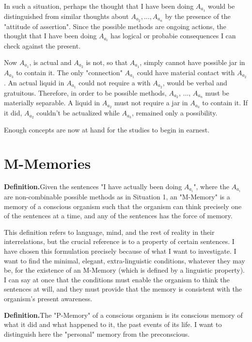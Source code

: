 In such a situation, perhaps the thought that I have been doing $A_{a_1}$
would be distinguished from similar thoughts about $A_{a_2}, ..., A_{a_n}$ by the
presence of the "attitude of assertion". Since the possible methods are 
ongoing actions, the thought that I have been doing $A_{a_i}$ has logical or 
probabie consequences I can check against the present. 

Now $A_{a_1}$, is actual and $A_{a_2}$ is not, so that $A_{a_1}$, simply cannot have 
possible jar in $A_{a_3}$ to contain it. The only "connection" $A_{a_1}$ could have
material contact with $A_{a_2}$. An actual liquid in $A_{a_1}$ could not require a 
with $A_{a_2}$, would be verbal and gratuitous. Therefore, in order to be possible 
methods, $A_{a_2}$, ..., $A_{a_n}$ must be materially separable. A liquid in $A_{a_2}$ must
not require a jar in $A_{a_3}$ to contain it. If it did, $A_{a_2}$ couldn't be actualized 
while $A_{a_3}$, remained only a possibility. 

Enough concepts are now at hand for the studies to begin in earnest. 

\section{M-Memories}

\newcommand{\definition}{\textbf{Definition.}}
\newcommand{\assumption}[1]{\textit{Assumption #1.}}
\newcommand{\conclusion}[1]{\textbf{Conclusion #1.}}

\definition Given the sentences "I have actually been doing $A_{a_i}$", where 
the $A_{a_i}$ are non-combinable possible methods as in Situation 1, an 
"M-Memory" is a memory of a conscious organism such that the organism 
can think precisely one of the sentences at a time, and any of the sentences 
has the force of memory. 

This definition refers to language, mind, and the rest of reality in their 
interrelations, but the crucial reference is to a property of certain sentences. 
I have chosen this formulation precisely because of what I want to 
investigate. I want to find the minimal, elegant, extra-linguistic conditions, 
whatever they may be, for the existence of an M-Memory (which is defined 
by a linguistic property). I can say at once that the conditions must enable 
the organism to think the sentences at will, and they must provide that the 
memory is consistent with the organism's present awareness. 

\definition The "P-Memory" of a conscious organism is its conscious 
memory of what it did and what happened to it, the past events of its life. I 
want to distinguish here the "personal" memory from the preconscious. 

